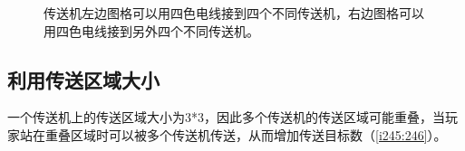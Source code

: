 \begin{figure}[!ht]
\begin{center}
\qquad
{}
\end{center}
\caption{传送机左边图格可以用四色电线接到四个不同传送机，右边图格可以用四色电线接到另外四个不同传送机。}
\label{i243:244}
\end{figure}

\subsection{利用传送区域大小}
一个传送机上的传送区域大小为3*3，因此多个传送机的传送区域可能重叠，当玩家站在重叠区域时可以被多个传送机传送，从而增加传送目标数（\autoref{i245:246}）。

